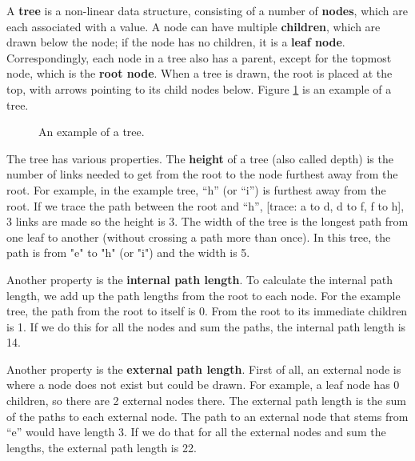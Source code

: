 A \textbf{tree} is a non-linear data structure, consisting of a number of \textbf{nodes}, which are each associated with a value. A node can have multiple \textbf{children}, which are drawn below the node; if the node has no children, it is a \textbf{leaf node}. Correspondingly, each node in a tree also has a parent, except for the topmost node, which is the \textbf{root node}. When a tree is drawn, the root is placed at the top, with arrows pointing to its child nodes below. Figure \ref{fig:tree0} is an example of a tree. 

\begin{figure}[h]
\centering
{}
\caption{An example of a tree.}
\label{fig:tree0}
\end{figure}


The tree has various properties. The \textbf{height} of a tree (also called depth) is the number of links needed to get from the root to the node furthest away from the root. For example, in the example tree, “h” (or “i”) is furthest away from the root. If we trace the path between the root and “h”, [trace: a to d, d to f, f to h], 3 links are made so the height is 3. The width of the tree is the longest path from one leaf to another (without crossing a path more than once). In this tree, the path is from "e" to "h" (or "i") and the width is 5. 

Another property is the \textbf{internal path length}. To calculate the internal path length, we add up the path lengths from the root to each node. For the example tree, the path from the root to itself is 0. From the root to its immediate children is 1. If we do this for all the nodes and sum the paths, the internal path length is 14. 

Another property is the \textbf{external path length}. First of all, an external node is where a node does not exist but could be drawn. For example, a leaf node has 0 children, so there are 2 external nodes there. The external path length is the sum of the paths to each external node. The path to an external node that stems from “e” would have length 3. If we do that for all the external nodes and sum the lengths, the external path length is 22. 


